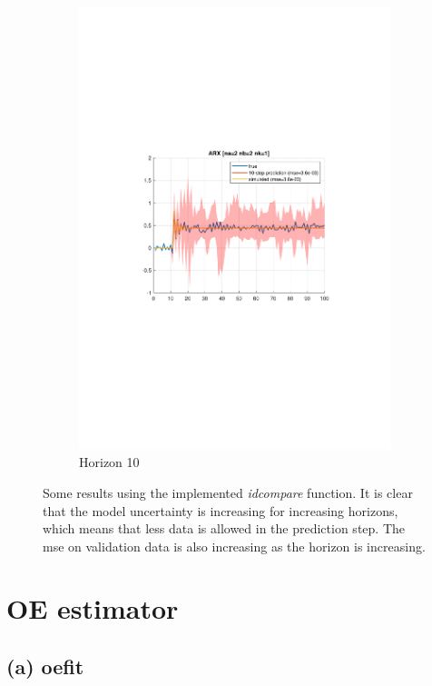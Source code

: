 \documentclass[]{article}
\begin{document}
\begin{figure}[ht]
\begin{subfigure}{.30\textwidth}
	\includegraphics[trim= 10cm 8cm 10cm 8cm, scale=0.3]{figures/1d-horizon_10.pdf}
	\caption{Horizon 10}
	\label{fig:1d-horizon10}
\end{subfigure}
\caption{Some results using the implemented \emph{idcompare} function. It is clear that the model uncertainty is increasing for increasing horizons, which means that less data is allowed in the prediction step. The mse on validation data is also increasing as the horizon is increasing.}
\label{fig:1d}
\end{figure}

\section{OE estimator}

\subsection{(a) oefit}
\end{document}
